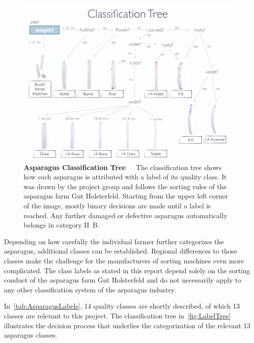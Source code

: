 \begin{figure}[!b]
	\centering
	\includegraphics[scale=0.39]{Figures/chapter01/treewithtitle.png}
	\decoRule
	\caption[Asparagus Classification Tree]{\textbf{Asparagus Classification Tree}~~~The classification tree shows how each asparagus is attributed with a label of its quality class. It was drawn by the project group and follows the sorting rules of the asparagus farm Gut Holsterfeld. Starting from the upper left corner of the image, mostly binary decisions are made until a label is reached. Any further damaged or defective asparagus automatically belongs in category II~B.}
	\label{fig:LabelTree}
\end{figure}

\bigskip
Depending on how carefully the individual farmer further categorizes the asparagus, additional classes can be established. Regional differences to those classes make the challenge for the manufacturers of sorting machines even more complicated. The class labels as stated in this report depend solely on the sorting conduct of the asparagus farm Gut Holsterfeld and do not necessarily apply to any other classification system of the asparagus industry.

In~\autoref{tab:AsparagusLabels}, 14 quality classes are shortly described, of which 13 classes are relevant to this project. The classification tree in~\autoref{fig:LabelTree} illustrates the decision process that underlies the categorization of the relevant 13 asparagus classes.

